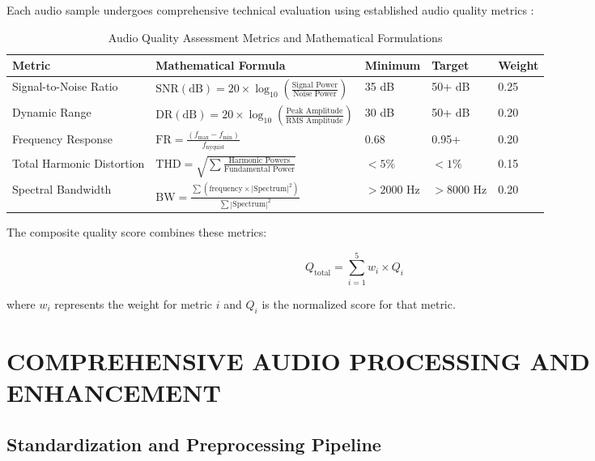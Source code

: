 \documentclass[12pt,a4paper]{article}
\begin{document}
Each audio sample undergoes comprehensive technical evaluation using established audio quality metrics \citep{thiede2000peaq, kabal2002examination}:

\begin{table}[h]
\centering
\caption{Audio Quality Assessment Metrics and Mathematical Formulations}
\begin{tabular}{@{}p{3cm}p{4cm}p{2cm}p{2cm}p{2cm}@{}}
\toprule
\textbf{Metric} & \textbf{Mathematical Formula} & \textbf{Minimum} & \textbf{Target} & \textbf{Weight} \\
\midrule
Signal-to-Noise Ratio & $\text{SNR}(\text{dB}) = 20 \times \log_{10}\left(\frac{\text{Signal Power}}{\text{Noise Power}}\right)$ & 35 dB & 50+ dB & 0.25 \\
\addlinespace
Dynamic Range & $\text{DR}(\text{dB}) = 20 \times \log_{10}\left(\frac{\text{Peak Amplitude}}{\text{RMS Amplitude}}\right)$ & 30 dB & 50+ dB & 0.20 \\
\addlinespace
Frequency Response & $\text{FR} = \frac{(f_{\max} - f_{\min})}{f_{\text{nyquist}}}$ & 0.68 & 0.95+ & 0.20 \\
\addlinespace
Total Harmonic Distortion & $\text{THD} = \sqrt{\sum \frac{\text{Harmonic Powers}}{\text{Fundamental Power}}}$ & $< 5\%$ & $< 1\%$ & 0.15 \\
\addlinespace
Spectral Bandwidth & $\text{BW} = \frac{\sum (\text{frequency} \times |\text{Spectrum}|^2)}{\sum |\text{Spectrum}|^2}$ & $> 2000$ Hz & $> 8000$ Hz & 0.20 \\
\bottomrule
\end{tabular}
\end{table}

The composite quality score combines these metrics:

\begin{equation}
Q_{\text{total}} = \sum_{i=1}^{5} w_i \times Q_i
\end{equation}

where $w_i$ represents the weight for metric $i$ and $Q_i$ is the normalized score for that metric.

\section{COMPREHENSIVE AUDIO PROCESSING AND ENHANCEMENT}

\subsection{Standardization and Preprocessing Pipeline}
\end{document}
